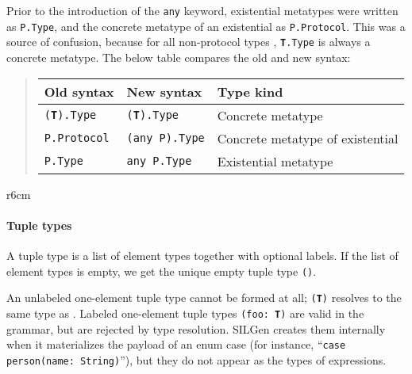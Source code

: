 \documentclass[../generics]{subfiles}
\begin{document}
Prior to the introduction of the \texttt{any} keyword, existential metatypes were written as \texttt{P.Type}, and the concrete metatype of an existential as \texttt{P.Protocol}. This was a source of confusion, because for all non-protocol types , \texttt{\textbf{T}.Type} is always a concrete metatype. The below table compares the old and new syntax:
\begin{quote}
\begin{tabular}{lll}
\toprule
\textbf{Old syntax}&\textbf{New syntax}&\textbf{Type kind}\\
\midrule
\texttt{(\textbf{T}).Type}&\texttt{(\textbf{T}).Type}&Concrete metatype\\
\texttt{P.Protocol}&\texttt{(any P).Type}&Concrete metatype of existential\\
\texttt{P.Type}&\texttt{any P.Type}&Existential metatype\\
\bottomrule
\end{tabular}
\end{quote}

\begin{wrapfigure}[12]{r}{6cm}
\begin{center}
\end{center}
\end{wrapfigure}

\paragraph{Tuple types}
A tuple type is a list of element types together with optional labels. If the list of element types is empty, we get the unique empty tuple type \texttt{()}.

An unlabeled one-element tuple type cannot be formed at all; \texttt{(\textbf{T})} resolves to the same type as . Labeled one-element tuple types \texttt{(foo:\ \textbf{T})} are valid in the grammar, but are rejected by type resolution. SILGen creates them internally when it materializes the payload of an enum case (for instance, ``\texttt{case person(name:\ String)}''), but they do not appear as the types of expressions.
\end{document}
